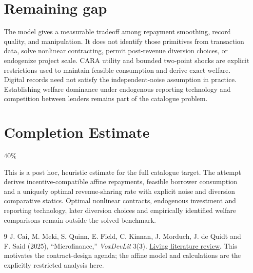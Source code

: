 \documentclass[11pt,a4paper]{article}
\theoremstyle{remark}
\begin{document}
\section{Remaining gap}
The model gives a measurable tradeoff among repayment smoothing, record quality, and manipulation. It does not identify those primitives from transaction data, solve nonlinear contracting, permit post-revenue diversion choices, or endogenize project scale. CARA utility and bounded two-point shocks are explicit restrictions used to maintain feasible consumption and derive exact welfare. Digital records need not satisfy the independent-noise assumption in practice. Establishing welfare dominance under endogenous reporting technology and competition between lenders remains part of the catalogue problem.

\section{Completion Estimate}
40\%

This is a post hoc, heuristic estimate for the full catalogue target.
The attempt derives incentive-compatible affine repayments, feasible borrower consumption and a uniquely optimal revenue-sharing rate with explicit noise and diversion comparative statics. Optimal nonlinear contracts, endogenous investment and reporting technology, later diversion choices and empirically identified welfare comparisons remain outside the solved benchmark.

\begin{thebibliography}{9}
 J. Cai, M. Meki, S. Quinn, E. Field, C. Kinnan, J. Morduch, J. de Quidt and F. Said (2025), ``Microfinance,'' \emph{VoxDevLit} 3(3). \href{https://voxdev.org/voxdevlit/microfinance}{Living literature review}. This motivates the contract-design agenda; the affine model and calculations are the explicitly restricted analysis here.
\end{thebibliography}
\end{document}
